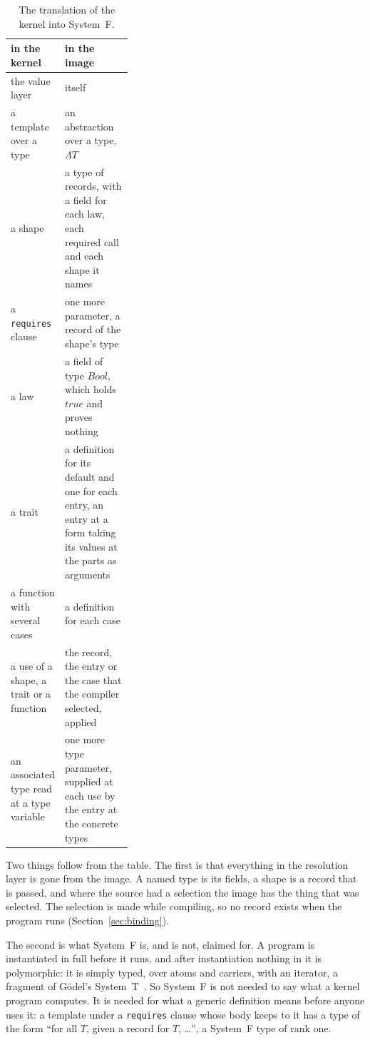 \begin{table}[tb]
\centering
\small
\begin{tabularx}{\linewidth}{@{}>{\raggedright\arraybackslash}p{0.34\linewidth}>{\raggedright\arraybackslash}X@{}}
\toprule
in the kernel & in the image \\
\midrule
the value layer & itself \\
a template over a type & an abstraction over a type, $\Lambda T$ \\
a shape & a type of records, with a field for each law, each required call and each shape it names \\
a \texttt{requires} clause & one more parameter, a record of the shape's type \\
a law & a field of type $\mathit{Bool}$, which holds $\mathit{true}$ and proves nothing \\
a trait & a definition for its default and one for each entry, an entry at a form taking its values at the parts as arguments \\
a function with several cases & a definition for each case \\
a use of a shape, a trait or a function & the record, the entry or the case that the compiler selected, applied \\
an associated type read at a type variable & one more type parameter, supplied at each use by the entry at the concrete types \\
\bottomrule
\end{tabularx}
\caption{The translation of the kernel into System~F.}
\label{tab:image}
\end{table}

Two things follow from the table.
The first is that everything in the resolution layer is gone from the image.
A named type is its fields, a shape is a record that is passed, and where the source had a selection the image has the thing that was selected.
The selection is made while compiling, so no record exists when the program runs (Section~\ref{sec:binding}).

The second is what System~F is, and is not, claimed for.
A program is instantiated in full before it runs, and after instantiation nothing in it is polymorphic: it is simply typed, over atoms and carriers, with an iterator, a fragment of G\"odel's System~T~\cite{girard1989proofs}.
So System~F is not needed to say what a kernel program computes.
It is needed for what a generic definition means before anyone uses it: a template under a \texttt{requires} clause whose body keeps to it has a type of the form ``for all $T$, given a record for $T$, \ldots'', a System~F type of rank one.

